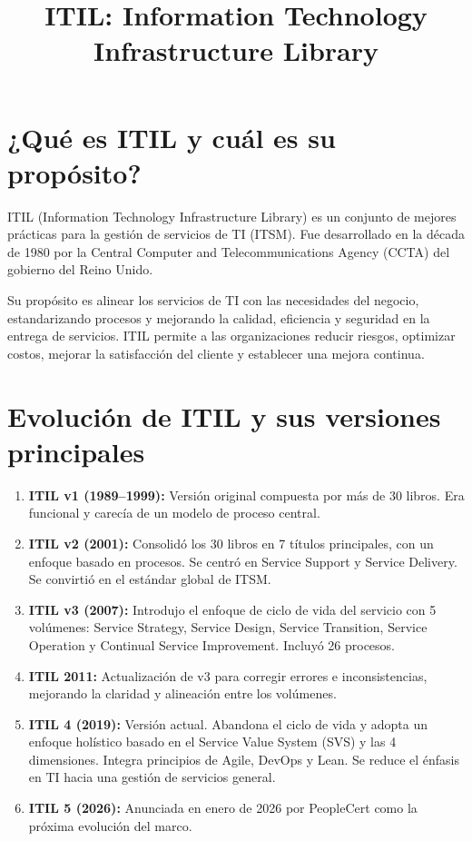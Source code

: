 \documentclass{article}
\title{ITIL: Information Technology Infrastructure Library}
\author{}
\date{}
\begin{document}
\maketitle

\section{¿Qué es ITIL y cuál es su propósito?}

ITIL (Information Technology Infrastructure Library) es un conjunto de mejores prácticas para la gestión de servicios de TI (ITSM). Fue desarrollado en la década de 1980 por la Central Computer and Telecommunications Agency (CCTA) del gobierno del Reino Unido.

Su propósito es alinear los servicios de TI con las necesidades del negocio, estandarizando procesos y mejorando la calidad, eficiencia y seguridad en la entrega de servicios. ITIL permite a las organizaciones reducir riesgos, optimizar costos, mejorar la satisfacción del cliente y establecer una mejora continua.

\section{Evolución de ITIL y sus versiones principales}

\begin{enumerate}
    \item \textbf{ITIL v1 (1989--1999):} Versión original compuesta por más de 30 libros. Era funcional y carecía de un modelo de proceso central.
    \item \textbf{ITIL v2 (2001):} Consolidó los 30 libros en 7 títulos principales, con un enfoque basado en procesos. Se centró en Service Support y Service Delivery. Se convirtió en el estándar global de ITSM.
    \item \textbf{ITIL v3 (2007):} Introdujo el enfoque de ciclo de vida del servicio con 5 volúmenes: Service Strategy, Service Design, Service Transition, Service Operation y Continual Service Improvement. Incluyó 26 procesos.
    \item \textbf{ITIL 2011:} Actualización de v3 para corregir errores e inconsistencias, mejorando la claridad y alineación entre los volúmenes.
    \item \textbf{ITIL 4 (2019):} Versión actual. Abandona el ciclo de vida y adopta un enfoque holístico basado en el Service Value System (SVS) y las 4 dimensiones. Integra principios de Agile, DevOps y Lean. Se reduce el énfasis en TI hacia una gestión de servicios general.
    \item \textbf{ITIL 5 (2026):} Anunciada en enero de 2026 por PeopleCert como la próxima evolución del marco.
\end{enumerate}
\end{document}
